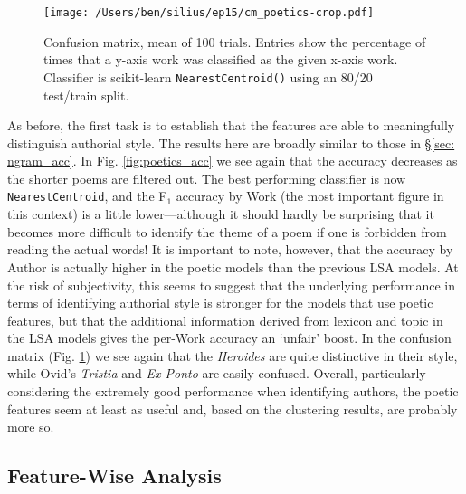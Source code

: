 \documentclass[twocolumn, switch, a4paper]{article} %
\begin{document}
\begin{figure}
\caption{
  Confusion matrix, mean of 100 trials. Entries show the percentage of times
that a y-axis work was classified as the given x-axis work. Classifier is
scikit-learn \texttt{NearestCentroid()} using an 80/20 test/train split.}
\label{fig:cm_poetics}
\texttt{[image: /Users/ben/silius/ep15/cm\_poetics-crop.pdf]}
\end{figure}

As before, the first task is to establish that the features are able to
meaningfully distinguish authorial style. The results here are broadly similar
to those in \S \ref{sec: ngram_acc}. In Fig. \ref{fig:poetics_acc} we see
again that the accuracy decreases as the shorter poems are filtered out. The
best performing classifier is now \texttt{NearestCentroid}, and the F$_1$
accuracy by Work (the most important figure in this context) is a little
lower---although it should hardly be surprising that it becomes more difficult
to identify the theme of a poem if one is forbidden from reading the actual
words! It is important to note, however, that the accuracy by Author is
actually higher in the poetic models than the previous LSA models. At the risk
of subjectivity, this seems to suggest that the underlying performance in
terms of identifying authorial style is stronger for the models that use
poetic features, but that the additional information derived from lexicon and
topic in the LSA models gives the per-Work accuracy an `unfair' boost. In the
confusion matrix (Fig. \ref{fig:cm_poetics}) we see again that the
\emph{Heroides} are quite distinctive in their style, while Ovid's
\emph{Tristia} and \emph{Ex Ponto} are easily confused. Overall, particularly
considering the extremely good performance when identifying authors, the
poetic features seem at least as useful and, based on the clustering results,
are probably more so.

\subsection{Feature-Wise Analysis}
\end{document}
